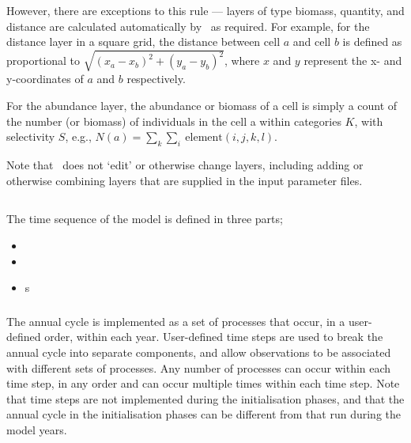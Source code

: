 However, there are  exceptions to this rule --- layers of type biomass, quantity, and distance are calculated automatically by \SPM\ as required. For example, for the distance layer in a square grid, the distance between cell $a$ and cell $b$ is defined as proportional to $\sqrt{(x_a-x_b)^2 +(y_a-y_b)^2}$, where $x$ and $y$ represent the x- and y-coordinates of $a$ and $b$ respectively.

For the abundance layer, the abundance or biomass of a cell is simply a count of the number (or biomass) of individuals in the cell a within categories $K$, with selectivity $S$, e.g., $N(a)=\sum_k \sum_i \ \text{element}(i,j,k,l)$.

Note that \SPM\ does not `edit' or otherwise change layers, including adding or otherwise combining layers that are supplied in the input parameter files.

\subsection{}

The time sequence of the model is defined in three parts;
\begin{itemize}
  \item {}
  \item {}
  \item {}s
\end{itemize}

\subsubsection{}

The annual cycle is implemented as a set of processes that occur, in a user-defined order, within each year. User-defined time steps are used to break the annual cycle into separate components, and allow observations to be associated with different sets of processes. Any number of processes can occur within each time step, in any order and can occur multiple times within each time step. Note that time steps are not implemented during the initialisation phases, and that the annual cycle in the initialisation phases can be different from that run during the model years.

\subsubsection{}

